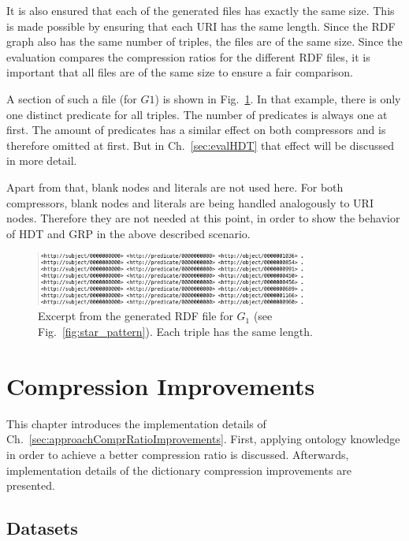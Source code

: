 It is also ensured that each of the generated files has exactly the same size. This is made possible by ensuring that each URI has the same length. Since the RDF graph also has the same number of triples, the files are of the same size. Since the evaluation compares the compression ratios for the different RDF files, it is important that all files are of the same size to ensure a fair comparison.

A section of such a file (for $G1$) is shown in Fig.~\ref{fig:rdfFile}. In that example, there is only one distinct predicate for all triples. The number of predicates is always one at first. The amount of predicates has a similar effect on both compressors and is therefore omitted at first. But in Ch.~\ref{sec:evalHDT} that effect will be discussed in more detail.

Apart from that, blank nodes and literals are not used here. For both compressors, blank nodes and literals are being handled analogously to URI nodes. Therefore they are not needed at this point, in order to show the behavior of HDT and GRP in the above described scenario.

\begin{figure}[h]
	\centering
	\includegraphics[width=0.8\textwidth]{figures/GRPvsHDT/file.png}
	\caption{Excerpt from the generated RDF file for $G_1$ (see Fig.~\ref{fig:star_pattern}). Each triple has the same length.}
	\label{fig:rdfFile}
\end{figure}

\section{Compression Improvements}\label{sec:implementationComprRatioImprovements}

This chapter introduces the implementation details of Ch.~\ref{sec:approachComprRatioImprovements}. First, applying ontology knowledge in order to achieve a better compression ratio is discussed. Afterwards, implementation details of the dictionary compression improvements are presented.

\subsection{Datasets}\label{sec:implementationDatasets}

